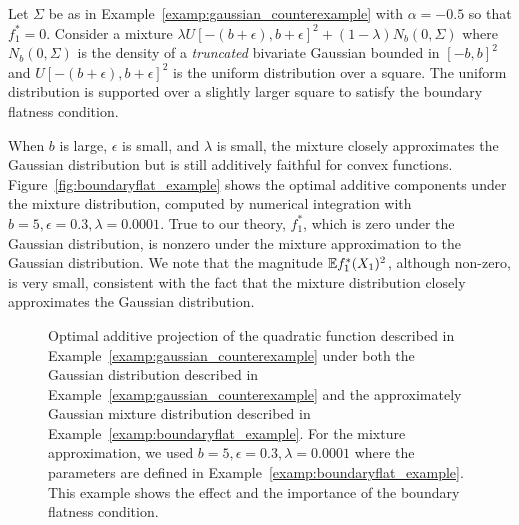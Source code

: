 \begin{example} 
\label{examp:boundaryflat_example}
Let $\Sigma$ be as in Example~\ref{examp:gaussian_counterexample} with
$\alpha = -0.5$ so that $f^*_1 = 0$. Consider a mixture $\lambda
U[-(b+\epsilon), b+\epsilon]^2 + (1-\lambda) N_b(0, \Sigma)$ where
$N_b(0,\Sigma)$ is the density of a \emph{truncated} bivariate
Gaussian bounded in $[-b, b]^2$ and $U[-(b+\epsilon), b+\epsilon]^2$
is the uniform distribution over a square. The uniform distribution is
supported over a slightly larger square to satisfy the boundary
flatness condition.

When $b$ is large, $\epsilon$ is small, and $\lambda$ is small, the
mixture closely approximates the Gaussian distribution but is still
additively faithful for convex
functions. Figure~\ref{fig:boundaryflat_example} shows the optimal
additive components under the mixture distribution, computed by
numerical integration with $b=5, \epsilon=0.3, \lambda=0.0001$. True
to our theory, $f^*_1$, which is zero under the Gaussian distribution,
is nonzero under the mixture approximation to the Gaussian
distribution. We note that the magnitude ${\mathbb E} f^*_1(X_1)^2$, although
non-zero, is very small, consistent with the fact that the mixture
distribution closely approximates the Gaussian distribution.
\end{example}


\begin{figure}[htp]
\vskip-10pt
	\centering
\caption{Optimal additive projection of the quadratic function
  described in Example~\ref{examp:gaussian_counterexample} under both
  the Gaussian distribution described in
  Example~\ref{examp:gaussian_counterexample} and the
  approximately Gaussian mixture distribution described in
  Example~\ref{examp:boundaryflat_example}. For the mixture
  approximation, we used $b=5, \epsilon=0.3, \lambda=0.0001$ where the
  parameters are defined in
  Example~\ref{examp:boundaryflat_example}. This example shows the
  effect and the importance of the boundary flatness condition.}
\vskip-10pt
\end{figure}


